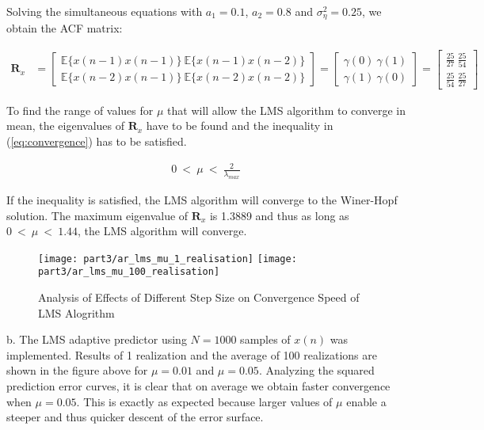 \noindent{}Solving the simultaneous equations with $a_1=0.1$, $a_2=0.8$ and $\sigma_{\eta}^2=0.25$, we obtain the ACF matrix:

\begin{align*}
\textbf{R}_x &= 
\begin{bmatrix}
\mathbb{E}\{x(n-1)x(n-1)\} \ \mathbb{E}\{x(n-1)x(n-2)\} \\ 
\mathbb{E}\{x(n-2)x(n-1)\} \ \mathbb{E}\{x(n-2)x(n-2)\}
\end{bmatrix}
=
\begin{bmatrix}
\gamma(0) \ \gamma(1) \\ 
\gamma(1) \ \gamma(0)
\end{bmatrix}
= 
\begin{bmatrix}
\frac{25}{27} \ \frac{25}{54} \\ 
\frac{25}{54} \ \frac{25}{27}
\end{bmatrix}
\end{align*} 

\noindent{}To find the range of values for $\mu$ that will allow the LMS algorithm to converge in mean, the eigenvalues of $\textbf{R}_x$ have to be found and the inequality in (\ref{eq:convergence}) has to be satisfied.

\begin{align}
0 \ < \ \mu \ < \ \frac{2}{\lambda_{max}} \label{eq:convergence}
\end{align}

\noindent{}If the inequality is satisfied, the LMS algorithm will converge to the Winer-Hopf solution. The maximum eigenvalue of $\textbf{R}_x$ is 1.3889 and thus as long as $0 \ < \ \mu \ < \ 1.44$, the LMS algorithm will converge.

\begin{figure}[H]
\centering{}
\texttt{[image: part3/ar\_lms\_mu\_1\_realisation]}
\texttt{[image: part3/ar\_lms\_mu\_100\_realisation]}
\caption{Analysis of Effects of Different Step Size on Convergence Speed of LMS Alogrithm}
\end{figure}

\noindent{}b. The LMS adaptive predictor using $N=1000$ samples of $x(n)$ was implemented. Results of 1 realization and the average of 100 realizations are shown in the figure above for $\mu=0.01$ and $\mu=0.05$. Analyzing the squared prediction error curves, it is clear that on average we obtain faster convergence when $\mu=0.05$. This is exactly as expected because larger values of $\mu$ enable a steeper and thus quicker descent of the error surface.

